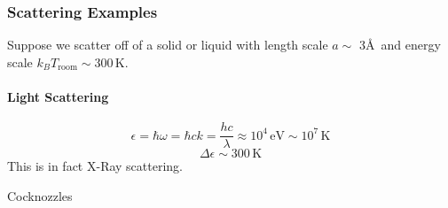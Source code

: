 \documentclass{article}
\begin{document}
			\subsubsection{Scattering Examples}
			Suppose we scatter off of a solid or liquid with length scale $a\sim$ 3\AA\  and energy scale $k_BT_{\mathrm{room}}\sim300\,\mathrm{K}$.
			\paragraph{Light Scattering} 
			$$\epsilon=\hbar\omega=\hbar ck=\frac{hc}{\lambda}\approx 10^4\,\mathrm{eV}\sim10^7\,\mathrm{K}$$
			$$\Delta \epsilon\sim 300\,\mathrm{K}$$
			This is in fact X-Ray scattering.
			
			Cocknozzles
			
			
			
			
			
			
\end{document}
